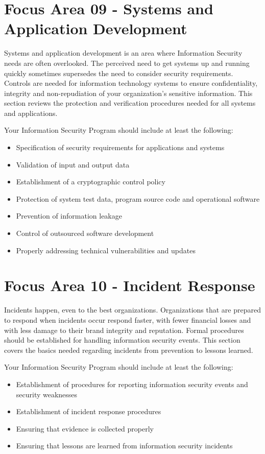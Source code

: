 \documentclass{needs}
\begin{document}
		
		\fEightTable
		
	\section{Focus Area 09 - Systems and Application Development}
	
		Systems and application development is an area where Information Security needs are often overlooked.  The perceived need to get systems up and running quickly sometimes supersedes the need to consider security requirements.  Controls are needed for information technology systems to ensure confidentiality, integrity and non-repudiation of your organization’s sensitive information.  This section reviews the protection and verification procedures needed for all systems and applications.
		
		Your Information Security Program should include at least the following: 
		\begin{itemize}
			\item Specification of security requirements for applications and systems
			\item Validation of input and output data
			\item Establishment of a cryptographic control policy
			\item Protection of system test data, program source code and operational software
			\item Prevention of information leakage
			\item Control of outsourced software development
			\item Properly addressing technical vulnerabilities and updates
		\end{itemize}		
		
		
		\fNineTable
		
		\section{Focus Area 10 - Incident Response}
		
			Incidents happen, even to the best organizations.  Organizations that are prepared to respond when incidents occur respond faster, with fewer financial losses and with less damage to their brand integrity and reputation.  Formal procedures should be established for handling information security events.  This section covers the basics needed regarding incidents from prevention to lessons learned.
			
			Your Information Security Program should include at least the following: 
			\begin{itemize}
				\item Establishment of procedures for reporting information security events and security weaknesses
				\item Establishment of incident response procedures
				\item Ensuring that evidence is collected properly
				\item Ensuring that lessons are learned from information security incidents
			\end{itemize}			
			
\end{document}
